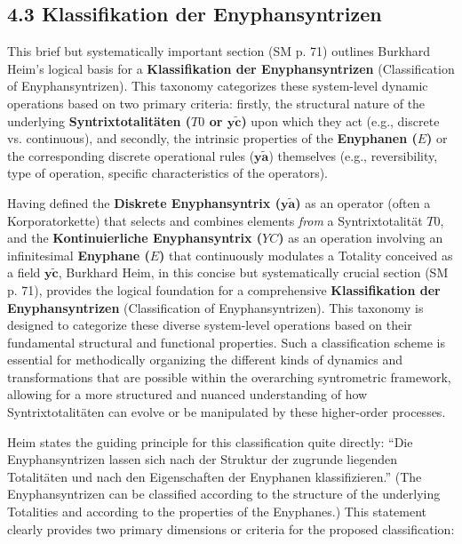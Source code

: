 \documentclass[12pt]{article}
\newcommand{\q}[1]{\enquote{#1}}
\newcommand{\syntrixtotalitaet}{T0}
\newcommand{\diskreteEnyphansyntrix}{\bm{y\widetilde{a}}}
\newcommand{\kontinuierlicheEnyphansyntrix}{YC}
\newcommand{\enyphane}{E}
\begin{document}
\subsection{4.3 Klassifikation der Enyphansyntrizen}
\label{sec:enyphansyntrix_classification}

This brief but systematically important section (SM p. 71) outlines Burkhard Heim's logical basis for a \textbf{Klassifikation der Enyphansyntrizen} (Classification of Enyphansyntrizen). This taxonomy categorizes these system-level dynamic operations based on two primary criteria: firstly, the structural nature of the underlying \textbf{Syntrixtotalitäten (\(\syntrixtotalitaet\) or \(\mathbf{y\widetilde{c}}\))} upon which they act (e.g., discrete vs. continuous), and secondly, the intrinsic properties of the \textbf{Enyphanen (\(\enyphane\))} or the corresponding discrete operational rules (\(\diskreteEnyphansyntrix\)) themselves (e.g., reversibility, type of operation, specific characteristics of the operators).

Having defined the \textbf{Diskrete Enyphansyntrix (\( \diskreteEnyphansyntrix \))} as an operator (often a Korporatorkette) that selects and combines elements \textit{from} a Syntrixtotalität \( \syntrixtotalitaet \), and the \textbf{Kontinuierliche Enyphansyntrix (\( \kontinuierlicheEnyphansyntrix \))} as an operation involving an infinitesimal \textbf{Enyphane (\( \enyphane \))} that continuously modulates a Totality conceived as a field \( \mathbf{y\widetilde{c}} \), Burkhard Heim, in this concise but systematically crucial section (SM p. 71), provides the logical foundation for a comprehensive \textbf{Klassifikation der Enyphansyntrizen} (Classification of Enyphansyntrizen). This taxonomy is designed to categorize these diverse system-level operations based on their fundamental structural and functional properties. Such a classification scheme is essential for methodically organizing the different kinds of dynamics and transformations that are possible within the overarching syntrometric framework, allowing for a more structured and nuanced understanding of how Syntrixtotalitäten can evolve or be manipulated by these higher-order processes.

Heim states the guiding principle for this classification quite directly: \q{Die Enyphansyntrizen lassen sich nach der Struktur der zugrunde liegenden Totalitäten und nach den Eigenschaften der Enyphanen klassifizieren.} (The Enyphansyntrizen can be classified according to the structure of the underlying Totalities and according to the properties of the Enyphanes.) This statement clearly provides two primary dimensions or criteria for the proposed classification:
\end{document}
